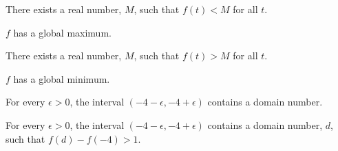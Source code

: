 \documentclass{ximera}
\begin{document}
\begin{exercise}
\begin{question} 

There exists a real number, $M$, such that $f(t) < M$ for all $t$.
\begin{multipleChoice}
\end{multipleChoice}





$f$ has a global maximum.
\begin{multipleChoice}
\end{multipleChoice}

\end{question}





\begin{question} 

There exists a real number, $M$, such that $f(t) > M$ for all $t$.
\begin{multipleChoice}
\end{multipleChoice}






$f$ has a global minimum.
\begin{multipleChoice}
\end{multipleChoice}





\end{question}










\begin{question} 


For every $\epsilon > 0$, the interval $(-4-\epsilon, -4+\epsilon)$ contains a domain number.
\begin{multipleChoice}
\end{multipleChoice}





For every $\epsilon > 0$, the interval $(-4-\epsilon, -4+\epsilon)$ contains a domain number, $d$, such that $f(d) - f(-4) > 1$.
\begin{multipleChoice}
\end{multipleChoice}



\end{question}
\end{exercise}
\end{document}

